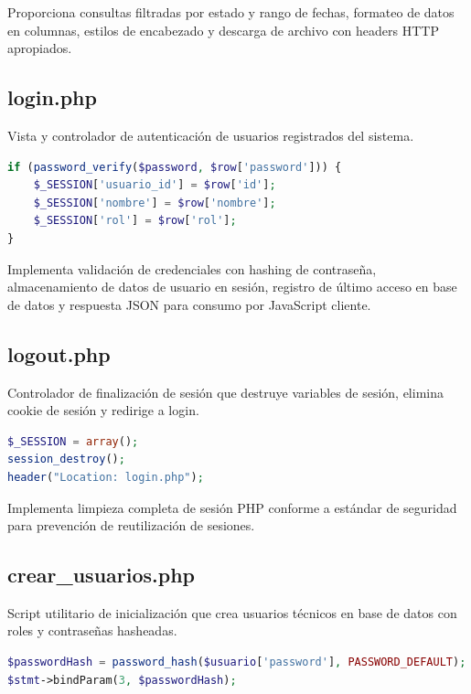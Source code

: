 \documentclass[12pt,a4paper]{article}
\begin{document}
Proporciona consultas filtradas por estado y rango de fechas, formateo de datos en columnas, estilos de encabezado y descarga de archivo con headers HTTP apropiados.

\subsection{login.php}

Vista y controlador de autenticación de usuarios registrados del sistema.

\begin{lstlisting}[language=PHP,caption={Validación de credenciales}]
if (password_verify($password, $row['password'])) {
    $_SESSION['usuario_id'] = $row['id'];
    $_SESSION['nombre'] = $row['nombre'];
    $_SESSION['rol'] = $row['rol'];
}
\end{lstlisting}

Implementa validación de credenciales con hashing de contraseña, almacenamiento de datos de usuario en sesión, registro de último acceso en base de datos y respuesta JSON para consumo por JavaScript cliente.

\subsection{logout.php}

Controlador de finalización de sesión que destruye variables de sesión, elimina cookie de sesión y redirige a login.

\begin{lstlisting}[language=PHP,caption={Destrucción de sesión}]
$_SESSION = array();
session_destroy();
header("Location: login.php");
\end{lstlisting}

Implementa limpieza completa de sesión PHP conforme a estándar de seguridad para prevención de reutilización de sesiones.

\subsection{crear\_usuarios.php}

Script utilitario de inicialización que crea usuarios técnicos en base de datos con roles y contraseñas hasheadas.

\begin{lstlisting}[language=PHP,caption={Hash de contraseña}]
$passwordHash = password_hash($usuario['password'], PASSWORD_DEFAULT);
$stmt->bindParam(3, $passwordHash);
\end{lstlisting}
\end{document}
